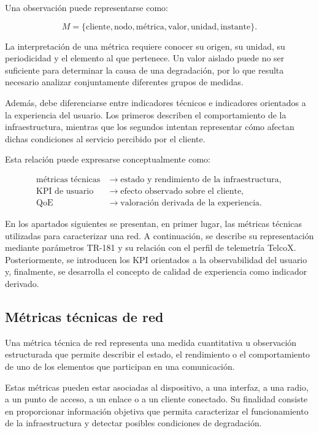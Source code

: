 Una observación puede representarse como:

\[
    M =
    \{
        \text{cliente},
        \text{nodo},
        \text{métrica},
        \text{valor},
        \text{unidad},
        \text{instante}
    \}.
\]

La interpretación de una métrica requiere conocer su origen, su unidad,
su periodicidad y el elemento al que pertenece. Un valor aislado puede no
ser suficiente para determinar la causa de una degradación, por lo que
resulta necesario analizar conjuntamente diferentes grupos de medidas.

Además, debe diferenciarse entre indicadores técnicos e indicadores
orientados a la experiencia del usuario. Los primeros describen el
comportamiento de la infraestructura, mientras que los segundos intentan
representar cómo afectan dichas condiciones al servicio percibido por el
cliente.

Esta relación puede expresarse conceptualmente como:

\[
\begin{aligned}
    \text{métricas técnicas}
    &\longrightarrow
    \text{estado y rendimiento de la infraestructura},\\
    \text{KPI de usuario}
    &\longrightarrow
    \text{efecto observado sobre el cliente},\\
    \text{QoE}
    &\longrightarrow
    \text{valoración derivada de la experiencia}.
\end{aligned}
\]

En los apartados siguientes se presentan, en primer lugar, las métricas
técnicas utilizadas para caracterizar una red. A continuación, se
describe su representación mediante parámetros TR-181 y su relación con
el perfil de telemetría TelcoX. Posteriormente, se introducen los KPI
orientados a la observabilidad del usuario y, finalmente, se desarrolla
el concepto de calidad de experiencia como indicador derivado.

\subsection{Métricas técnicas de red}
\label{subsec:metricas-tecnicas-red}

Una métrica técnica de red representa una medida cuantitativa u
observación estructurada que permite describir el estado, el rendimiento
o el comportamiento de uno de los elementos que participan en una
comunicación.

Estas métricas pueden estar asociadas al dispositivo, a una interfaz, a
una radio, a un punto de acceso, a un enlace o a un cliente conectado. Su
finalidad consiste en proporcionar información objetiva que permita
caracterizar el funcionamiento de la infraestructura y detectar posibles
condiciones de degradación.

